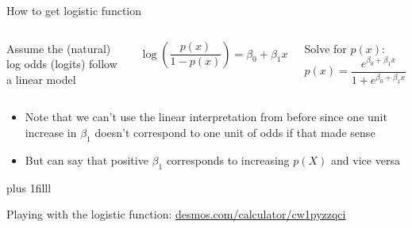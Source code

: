 \documentclass[aspectratio=169,usenames,dvipsnames]{beamer}
\newcommand{\InstructorList}[1]{
\begin{itemize}
	\color{orange}
	#1
\end{itemize}
}
\newcommand{\bvfill}{\vskip0pt plus 1filll}
\begin{document}



\begin{frame}[c]{How to get logistic function}

\begin{columns}
\centering
Assume the (natural) log odds (logits) follow a linear model

\begin{equation*}
	\log \left( \frac{p(x)}{1-p(x)} \right) = \beta_0 + \beta_1x
\end{equation*}


\centering
Solve for $p(x)$:
\begin{equation*}
	p(x) = \frac{e^{\beta_0 + \beta_1x}}{1+e^{\beta_0 + \beta_1x}}
\end{equation*}
\end{columns}
\InstructorList{
	\item Note that we can't use the linear interpretation from before since one unit increase in $\beta_1$ doesn't correspond to one unit of odds if that made sense 
	\item But can say that positive $\beta_1$ corresponds to increasing $p(X)$ and vice versa
}
\bvfill

Playing with the logistic function: \href{https://www.desmos.com/calculator/cw1pyzzqci}{desmos.com/calculator/cw1pyzzqci}
\end{frame}





\end{document}

